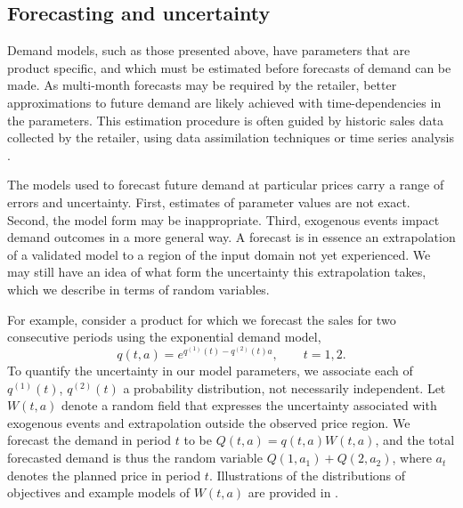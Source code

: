 \documentclass[main.tex]{subfiles}
\begin{document}
\subsection{Forecasting and uncertainty}
Demand models, such as those presented above, have parameters that are
product specific, and which must be estimated before forecasts of
demand can be made.
As multi-month forecasts may be required by the retailer, better
approximations to future demand are likely achieved with
time-dependencies in the parameters.
This estimation procedure is often guided by
historic sales data collected by the retailer, using data assimilation
techniques \citep{law2015data,riseth2017operator} or time series analysis
\citep{chatfield2004analysis}.

The models used to forecast future demand at particular prices carry
a range of errors and uncertainty. First, estimates of parameter values are not
exact. Second, the model form may be
inappropriate. Third, exogenous events impact demand outcomes in a more general
way.
A forecast is in essence an extrapolation of a validated model to a
region of the input domain not yet experienced. We may still have an
idea of what form the uncertainty this extrapolation takes, which
we describe in terms of random variables.

For example, consider a product for which we forecast the sales for
two consecutive periods using the exponential demand model,
\begin{equation}
  q(t,a) =
  e^{q^{(1)}(t)-q^{(2)}(t)a},\qquad t=1,2.
\end{equation}
To quantify the uncertainty in our model parameters, we associate
each of $q^{(1)}(t)$, $q^{(2)}(t)$ a probability distribution, not
necessarily independent.
Let $W(t,a)$ denote a random field that expresses the uncertainty
associated with exogenous events and extrapolation outside the
observed price region.
We forecast the demand in period $t$ to be $Q(t,a)=q(t,a)W(t,a)$, and
the total forecasted demand is thus the random variable $Q(1,a_1) +
Q(2,a_2)$, where $a_t$ denotes the planned price in period $t$.
Illustrations of the distributions of objectives and example models of
$W(t,a)$ are provided in
.
\end{document}
